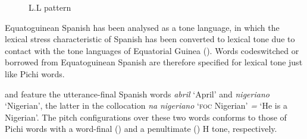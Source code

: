 \begin{figure}
\caption{L.L pattern}
\label{fig:key:3.8}
\end{figure}

Equatoguinean Spanish has been analysed as a tone language, in which the lexical stress characteristic of Spanish has been converted to lexical tone due to contact with the tone languages of Equatorial Guinea (\citealt{Lipski2015,SteienYakpo2017}). Words codeswitched or borrowed from Equatoguinean Spanish are therefore specified for lexical tone just like Pichi words. 


 and  feature the utterance-final Spanish words \textit{abril} ‘April’ and \textit{nigeriano} ‘Nigerian’, the latter in the collocation \textit{na} \textit{nigeriano} ‘\textsc{foc} Nigerian’ \textit{=} ‘He is a Nigerian’. The pitch configurations over these two words conforms to those of Pichi words with a word-final () and a penultimate () H tone, respectively. 


